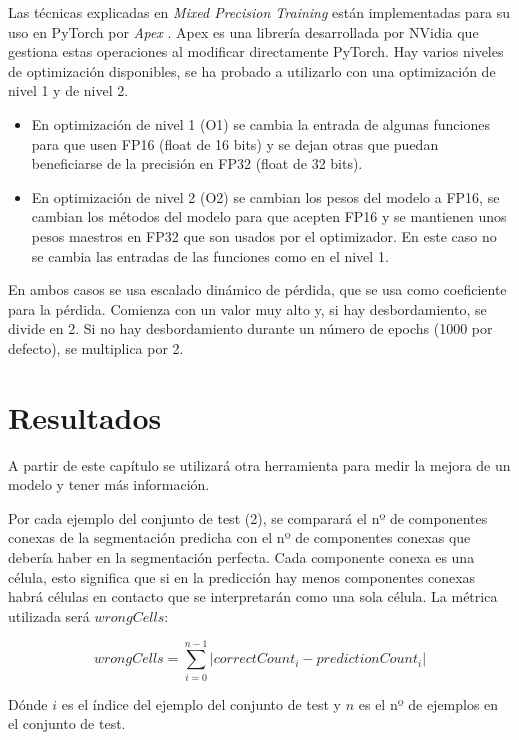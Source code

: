 Las técnicas explicadas en \textit{Mixed Precision Training} están implementadas para su uso en PyTorch por \textit{Apex} \cite{Apex2020}. Apex es una librería desarrollada por NVidia que gestiona estas operaciones al modificar directamente PyTorch. Hay varios niveles de optimización disponibles, se ha probado a utilizarlo con una optimización de nivel 1 y de nivel 2.
\begin{itemize}
\item En optimización de nivel 1 (O1) se cambia la entrada de algunas funciones para que usen FP16 (float de 16 bits) y se dejan otras que puedan beneficiarse de la precisión en FP32 (float de 32 bits).
\item En optimización de nivel 2 (O2) se cambian los pesos del modelo a FP16, se cambian los métodos del modelo para que acepten FP16 y se mantienen unos pesos maestros en FP32 que son usados por el optimizador. En este caso no se cambia las entradas de las funciones como en el nivel 1.
\end{itemize}

En ambos casos se usa escalado dinámico de pérdida, que se usa como coeficiente para la pérdida. Comienza con un valor muy alto y, si hay desbordamiento, se divide en 2. Si no hay desbordamiento durante un número de epochs (1000 por defecto), se multiplica por 2.

\section{Resultados}\label{sec:apex_resultados}

A partir de este capítulo se utilizará otra herramienta para medir la mejora de un modelo y tener más información.

Por cada ejemplo del conjunto de test (2), se comparará el nº de componentes conexas de la segmentación predicha con el nº de componentes conexas que debería haber en la segmentación perfecta. Cada componente conexa es una célula, esto significa que si en la predicción hay menos componentes conexas habrá células en contacto que se interpretarán como una sola célula. La métrica utilizada será $wrongCells$:

\begin{equation}
wrongCells = \sum_{i=0}^{n-1} \lvert correctCount_i - predictionCount_i \rvert
\end{equation}

Dónde $i$ es el índice del ejemplo del conjunto de test y $n$ es el nº de ejemplos en el conjunto de test.

